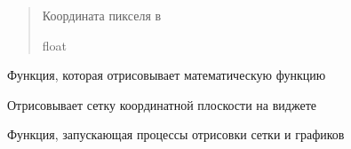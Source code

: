 \documentclass[letterpaper,10pt,russian]{sphinxmanual}
\begin{document}
\begin{fulllineitems}
\begin{fulllineitems}
\begin{quote}
\begin{description}
\sphinxAtStartPar
Координата пикселя в 

\sphinxAtStartPar
float

\end{description}\end{quote}

\end{fulllineitems}


\begin{fulllineitems}
\label{\detokenize{src:main.GraphicCalculator.draw_function}}
\pysigstartsignatures
\pysiglinewithargsret
{}
{}
{}
\pysigstopsignatures
\sphinxAtStartPar
Функция, которая отрисовывает математическую функцию

\end{fulllineitems}


\begin{fulllineitems}
\label{\detokenize{src:main.GraphicCalculator.draw_grid}}
\pysigstartsignatures
\pysiglinewithargsret
{}
{}
{}
\pysigstopsignatures
\sphinxAtStartPar
Отрисовывает сетку координатной плоскости на виджете 

\end{fulllineitems}


\begin{fulllineitems}
\label{\detokenize{src:main.GraphicCalculator.drawing_procedure}}
\pysigstartsignatures
\pysiglinewithargsret
{}
{}
{}
\pysigstopsignatures
\sphinxAtStartPar
Функция, запускающая процессы отрисовки сетки и графиков

\end{fulllineitems}



\end{fulllineitems}
\end{document}
